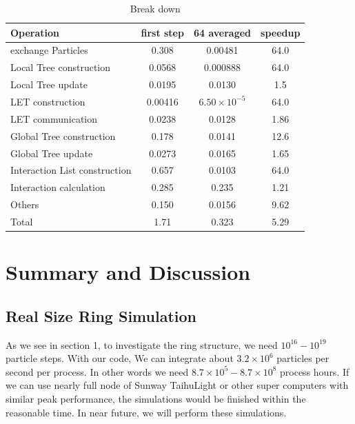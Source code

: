 \documentclass[oribibl]{llncs}
\begin{document}
\begin{table}
  \caption{Break down}
  \label{tab:break_down}
  \begin{tabular}{lccc}
    \toprule
    Operation & first step & 64 averaged & speedup\\
    \midrule
    exchange Particles            & 0.308   & 0.00481  & 64.0 \\
    Local Tree construction       & 0.0568  & 0.000888 & 64.0 \\
    Local Tree update             & 0.0195  & 0.0130   & 1.5 \\
    LET construction              & 0.00416 &  $6.50 \times 10^{-5}$  & 64.0 \\
    LET communication             & 0.0238  & 0.0128   & 1.86 \\
    Global Tree construction      & 0.178   & 0.0141   & 12.6 \\
    Global Tree update                 & 0.0273  & 0.0165   & 1.65 \\
    Interaction List construction & 0.657   & 0.0103   & 64.0 \\
    Interaction calculation       & 0.285   & 0.235    & 1.21 \\
    Others                        & 0.150   & 0.0156   & 9.62 \\
    \midrule
    Total                         & 1.71   & 0.323     & 5.29 \\
  \bottomrule
  \end{tabular}
\end{table}

\section{Summary and Discussion}

\subsection{Real Size Ring Simulation}

As we see in section 1, to investigate the ring structure, we need
$10^{16}-10^{19}$ particle steps. With our code, We can integrate
about $3.2 \times 10^6$ particles per second per process. In other
words we need $8.7 \times 10^5 - 8.7 \times 10^8$ process hours. If we
can use nearly full node of Sunway TaihuLight or other super computers
with similar peak performance, the simulations would be finished
within the reasonable time. In near future, we will perform these
simulations.
\end{document}
